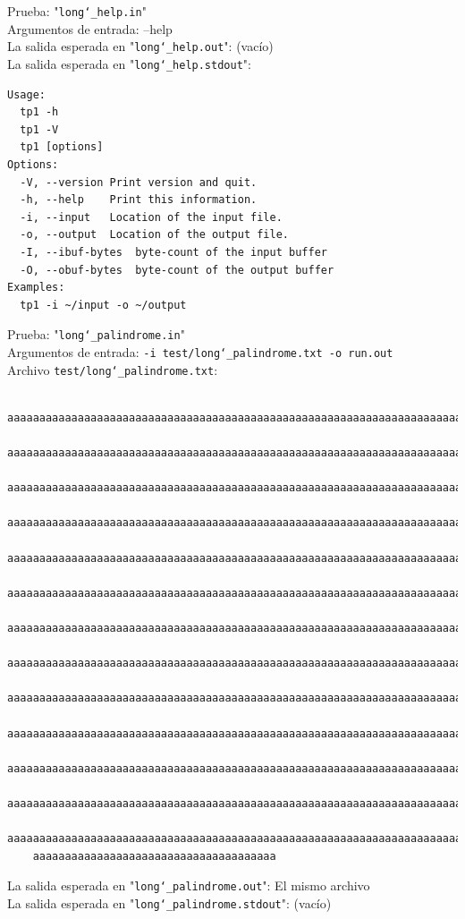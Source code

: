 \documentclass[a4paper,10pt]{article}
\begin{document}
  Prueba: "\texttt{long\char`_help.in}" \\
    Argumentos de entrada: --help\\
    La salida esperada en "\texttt{long\char`_help.out}": (vacío)\\
    La salida esperada en "\texttt{long\char`_help.stdout}":
        \begin{Verbatim}
Usage:
  tp1 -h
  tp1 -V
  tp1 [options]
Options:
  -V, --version	Print version and quit.
  -h, --help	Print this information.
  -i, --input	Location of the input file.
  -o, --output	Location of the output file.
  -I, --ibuf-bytes	byte-count of the input buffer
  -O, --obuf-bytes	byte-count of the output buffer
Examples:
  tp1 -i ~/input -o ~/output

  \end{Verbatim}
  
    Prueba: "\texttt{long\char`_palindrome.in}" \\
    Argumentos de entrada: \texttt{-i test/long\char`_palindrome.txt -o run.out}\\
    Archivo \texttt{test/long\char`_palindrome.txt}: \\
    \begin{Verbatim}
    aaaaaaaaaaaaaaaaaaaaaaaaaaaaaaaaaaaaaaaaaaaaaaaaaaaaaaaaaaaaaaaaaaaaaaaaaa
    aaaaaaaaaaaaaaaaaaaaaaaaaaaaaaaaaaaaaaaaaaaaaaaaaaaaaaaaaaaaaaaaaaaaaaaaaa
    aaaaaaaaaaaaaaaaaaaaaaaaaaaaaaaaaaaaaaaaaaaaaaaaaaaaaaaaaaaaaaaaaaaaaaaaaa
    aaaaaaaaaaaaaaaaaaaaaaaaaaaaaaaaaaaaaaaaaaaaaaaaaaaaaaaaaaaaaaaaaaaaaaaaaa
    aaaaaaaaaaaaaaaaaaaaaaaaaaaaaaaaaaaaaaaaaaaaaaaaaaaaaaaaaaaaaaaaaaaaaaaaaa
    aaaaaaaaaaaaaaaaaaaaaaaaaaaaaaaaaaaaaaaaaaaaaaaaaaaaaaaaaaaaaaaaaaaaaaaaaa
    aaaaaaaaaaaaaaaaaaaaaaaaaaaaaaaaaaaaaaaaaaaaaaaaaaaaaaaaaaaaaaaaaaaaaaaaaa
    aaaaaaaaaaaaaaaaaaaaaaaaaaaaaaaaaaaaaaaaaaaaaaaaaaaaaaaaaaaaaaaaaaaaaaaaaa
    aaaaaaaaaaaaaaaaaaaaaaaaaaaaaaaaaaaaaaaaaaaaaaaaaaaaaaaaaaaaaaaaaaaaaaaaaa
    aaaaaaaaaaaaaaaaaaaaaaaaaaaaaaaaaaaaaaaaaaaaaaaaaaaaaaaaaaaaaaaaaaaaaaaaaa
    aaaaaaaaaaaaaaaaaaaaaaaaaaaaaaaaaaaaaaaaaaaaaaaaaaaaaaaaaaaaaaaaaaaaaaaaaa
    aaaaaaaaaaaaaaaaaaaaaaaaaaaaaaaaaaaaaaaaaaaaaaaaaaaaaaaaaaaaaaaaaaaaaaaaaa
    aaaaaaaaaaaaaaaaaaaaaaaaaaaaaaaaaaaaaaaaaaaaaaaaaaaaaaaaaaaaaaaaaaaaaaaaaa
    aaaaaaaaaaaaaaaaaaaaaaaaaaaaaaaaaaaaaa
    \end{Verbatim}
    La salida esperada en "\texttt{long\char`_palindrome.out}": El mismo archivo\\
    La salida esperada en "\texttt{long\char`_palindrome.stdout}": (vacío)\\
  
\end{document}
